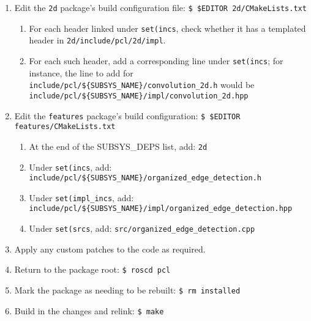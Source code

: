 \documentclass[12pt]{report}
\begin{document}
\begin{enumerate}
\item{Edit the \texttt{2d} package's build configuration file: \texttt{\$\ \$EDITOR 2d/CMakeLists.txt}}
\begin{enumerate}
\item{For each header linked under \texttt{set(incs}, check whether it has a templated header in \texttt{2d/include/pcl/2d/impl}.}
\item{For each such header, add a corresponding line under \texttt{set(incs}; for instance, the line to add for \texttt{include/pcl/\$\{SUBSYS\_NAME\}/convolution\_2d.h} would be \texttt{include/pcl/\$\{SUBSYS\_NAME\}/impl/convolution\_2d.hpp}}
\end{enumerate}
\item{Edit the \texttt{features} package's build configuration: \texttt{\$\ \$EDITOR features/CMakeLists.txt}}
\begin{enumerate}
\item{At the end of the SUBSYS\_DEPS list, add: \texttt{2d}}
\item{Under \texttt{set(incs}, add: \texttt{include/pcl/\$\{SUBSYS\_NAME\}/organized\_edge\_detection.h}}
\item{Under \texttt{set(impl\_incs}, add: \texttt{include/pcl/\$\{SUBSYS\_NAME\}/impl/organized\_edge\_detection.hpp}}
\item{Under \texttt{set(srcs}, add: \texttt{src/organized\_edge\_detection.cpp}}
\end{enumerate}
\item{Apply any custom patches to the code as required.}
\item{Return to the package root: \texttt{\$\ roscd pcl}}
\item{Mark the package as needing to be rebuilt: \texttt{\$\ rm installed}}
\item{Build in the changes and relink: \texttt{\$\ make}}
\end{enumerate}
\end{document}

